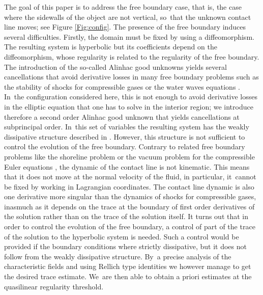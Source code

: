 The goal of this paper is to address the free boundary case, that is,
the case where the sidewalls of the object are not vertical, so~that the unknown contact line moves; see Figure \ref{Fig:config}.
The presence of the free boundary induces several difficulties.
Firstly, the domain must be fixed by using a diffeomorphism.
The resulting system is hyperbolic but its coefficients depend on the diffeomorphism, whose regularity is related to the regularity of the free boundary.
The introduction of the so-called Alinhac good unknowns \cite{Alinhac} yields several cancellations that avoid derivative losses in many free boundary problems
such as the stability of shocks for compressible gases \cite{Majda,Metivier} or the water waves equations \cite{Lannes2005,Iguchi,AlazardMetivier}. In~the configuration considered here, this is not enough to avoid derivative losses in the elliptic equation that one has to solve in the interior region;
we introduce therefore a second order Alinhac good unknown that yields cancellations at subprincipal order. In~this set of variables the resulting system has the weakly dissipative structure described in \cite{IguchiLannes2023}.
However, this structure is not sufficient to control the evolution of the free boundary.
Contrary to related free boundary problems like the shoreline problem \cite{LannesMetivier,Poyferre,MingWang} or
the vacuum problem for the compressible Euler equations \cite{CoutandShkoller,JangMasmoudi,IfrimTataru}, the dynamic of the contact line is not kinematic.
This means that it does not move at the normal velocity of the fluid, in particular, it~cannot be fixed by working in Lagrangian coordinates.
The contact line dynamic is also one derivative more singular than the dynamics of shocks for compressible gases,
inasmuch as it depends on the trace at the boundary of first order derivatives of the solution rather than on the trace of the solution itself.
It turns out that in order to control the evolution of the free boundary, a control of part of the trace of the solution to the hyperbolic system is needed.
Such a control would be provided if the boundary conditions where strictly dissipative, but it does not follow from the weakly dissipative structure. By~a precise analysis of the characteristic fields and using Rellich type identities we however manage to get the desired trace estimate. We~are then able to obtain a priori estimates at the quasilinear regularity threshold.

